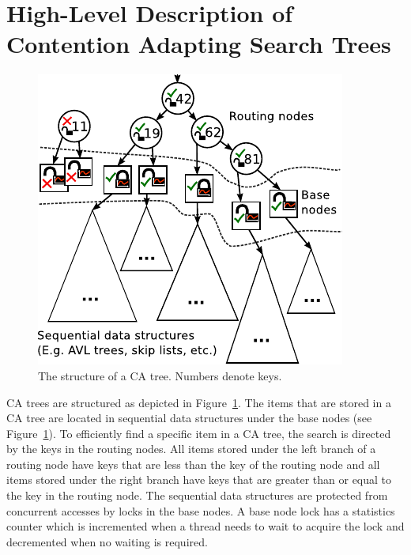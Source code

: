 \documentclass[a4paper,UKenglish]{oasics-v2016}
\newcommand{\cmark}{{\color{DarkGreen}\ding{51}}}
\newcommand{\xmark}{{\color{red}\ding{55}}}
\begin{document}
\section{High-Level Description of Contention Adapting Search Trees\label{sec:catreedesc}}
\begin{figure}
  \centering
  \includegraphics[width=.345\textwidth]{ca_tree3}
  \caption{The structure of a CA tree. Numbers denote keys.} %
  \label{fig:ca_structure}
\end{figure}
CA trees are structured as  depicted in Figure~\ref{fig:ca_structure}.
The items that are stored in a CA tree are located in sequential data structures under the base nodes (see Figure~\ref{fig:ca_structure}).
To efficiently find a specific item in a CA tree, the search is directed by the keys in the routing nodes.
All items stored under the left branch of a routing node have keys that are less than the key of the routing node and all items stored under the right branch have keys that are greater than or equal to the key in the routing node.
The sequential data structures are protected from concurrent accesses by locks in the base nodes.
A base node lock has a statistics counter which is incremented when a thread needs to wait to acquire the lock and decremented when no waiting is required.
\end{document}
